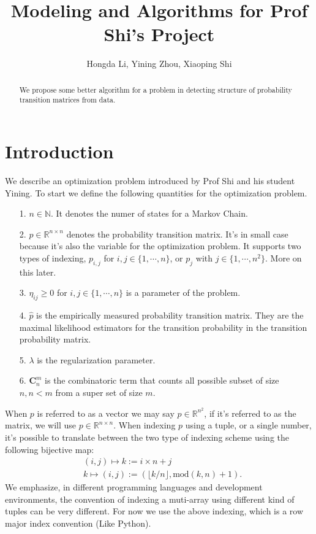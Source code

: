 \documentclass[11pt]{article}
\title{Modeling and Algorithms for Prof Shi's Project}
\author{Hongda Li, Yining Zhou, Xiaoping Shi}
\theoremstyle{definition}
\numberwithin{equation}{subsection}
\begin{document}
\maketitle

\begin{abstract}
    We propose some better algorithm for a problem in detecting structure of probability transition matrices from data. 
\end{abstract}


\section{Introduction}
    We describe an optimization problem introduced by Prof Shi and his student Yining. 
    To start we define the following quantities for the optimization problem. 
    \begin{itemize}
        \item [1.] $n\in \mathbb N$. It denotes the numer of states for a Markov Chain. 
        \item [2.] $p\in \mathbb R^{n\times n}$ denotes the probability transition matrix. It's in small case because it's also the variable for the optimization problem. It supports two types of indexing, $p_{i,j}$ for $i, j \in \{1, \cdots, n\}$, or $p_j$ with $j\in \{1, \cdots, n^2\}$. More on this later. 
        \item [3.] $\eta_{ij} \ge 0$ for $i, j \in \{1, \cdots, n\}$ is a parameter of the problem. 
        \item [4.] $\hat p$ is the empirically measured probability transition matrix. They are the maximal likelihood estimators for the transition probability in the transition probability matrix. 
        \item [5.] $\lambda$ is the regularization parameter. 
        \item [6.] $\mathbf C^m_n$ is the combinatoric term that counts all possible subset of size $n, n<m$ from a super set of size $m$. 
    \end{itemize}
    \par
    When $p$ is referred to as a vector we may say $p \in \mathbb R^{n^2}$, if it's referred to as the matrix, we will use $p \in \mathbb R^{n\times n}$. 
    When indexing $p$ using a tuple, or a single number, it's possible to translate between the two type of indexing scheme using the following bijective map: 
    \begin{align*}
        & (i, j) \mapsto k:= i \times n + j
        \\
        & k \mapsto (i, j) := (
            \lfloor k/n\rfloor, \text{mod}(k, n) + 1
        ). 
    \end{align*}
    We emphasize, in different programming languages and development environments, the convention of indexing a muti-array using different kind of tuples can be very different. 
    For now we use the above indexing, which is a row major index convention (Like Python). 
\end{document}
